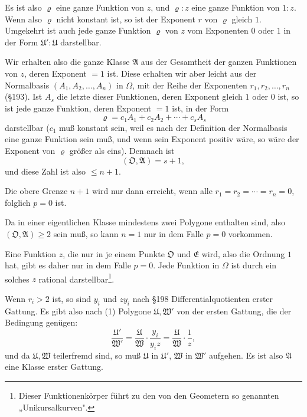 \documentclass[12pt,a4paper]{article}
\begin{document}
Es ist also $\varrho$ eine ganze Funktion von $z$, und $\varrho:z$ eine ganze Funktion von $1:z$. Wenn also $\varrho$ nicht konstant ist, so ist der Exponent $r$ von $\varrho$ gleich $1$. Umgekehrt ist auch jede ganze Funktion $\varrho$ von $z$ vom Exponenten $0$ oder $1$ in der Form $\mathfrak{U}':\mathfrak{U}$ darstellbar.

Wir erhalten also die ganze Klasse $\mathfrak{A}$ aus der Gesamtheit der ganzen Funktionen von $z$, deren Exponent $= 1$ ist. Diese erhalten wir aber leicht aus der Normalbasis $(A_1, A_2, \ldots, A_n)$ in $\Omega$, mit der Reihe der Exponenten $r_1, r_2, \ldots, r_n$ (\S 193). Ist $A_s$ die letzte dieser Funktionen, deren Exponent gleich $1$ oder $0$ ist, so ist jede ganze Funktion, deren Exponent $= 1$ ist, in der Form
\begin{equation}\label{eq:199-1}
\varrho = c_1 A_1 + c_2 A_2 + \cdots + c_s A_s
\end{equation}
darstellbar ($c_1$ muß konstant sein, weil es nach der Definition der Normalbasis eine ganze Funktion sein muß, und wenn sein Exponent positiv wäre, so wäre der Exponent von $\varrho$ größer als eins). Demnach ist
\begin{equation}\label{eq:199-2}
(\mathfrak{O}, \mathfrak{A}) = s + 1,
\end{equation}
und diese Zahl ist also $\leq n + 1$.

Die obere Grenze $n + 1$ wird nur dann erreicht, wenn alle $r_1 = r_2 = \cdots = r_n = 0$, folglich $p = 0$ ist.

Da in einer eigentlichen Klasse mindestens zwei Polygone enthalten sind, also $(\mathfrak{O}, \mathfrak{A}) \geq 2$ sein muß, so kann $n = 1$ nur in dem Falle $p = 0$ vorkommen.

Eine Funktion $z$, die nur in je einem Punkte $\mathfrak{O}$ und $\mathfrak{E}$ wird, also die Ordnung $1$ hat, gibt es daher nur in dem Falle $p = 0$. Jede Funktion in $\Omega$ ist durch ein solches $z$ rational darstellbar\footnote{Dieser Funktionenkörper führt zu den von den Geometern so genannten „Unikursalkurven".}.

Wenn $r_i > 2$ ist, so sind $y_i$ und $zy_i$ nach \S 198 Differentialquotienten erster Gattung. Es gibt also nach (1) Polygone $\mathfrak{U}, \mathfrak{W}'$ von der ersten Gattung, die der Bedingung genügen:
\[
\frac{\mathfrak{U}'}{\mathfrak{W}'} = \frac{\mathfrak{U}}{\mathfrak{W}} \cdot \frac{y_i}{y_i z} = \frac{\mathfrak{U}}{\mathfrak{W}} \cdot \frac{1}{z},
\]
und da $\mathfrak{U}, \mathfrak{W}$ teilerfremd sind, so muß $\mathfrak{U}$ in $\mathfrak{U}'$, $\mathfrak{W}$ in $\mathfrak{W}'$ aufgehen. Es ist also $\mathfrak{A}$ eine Klasse erster Gattung.
\end{document}
